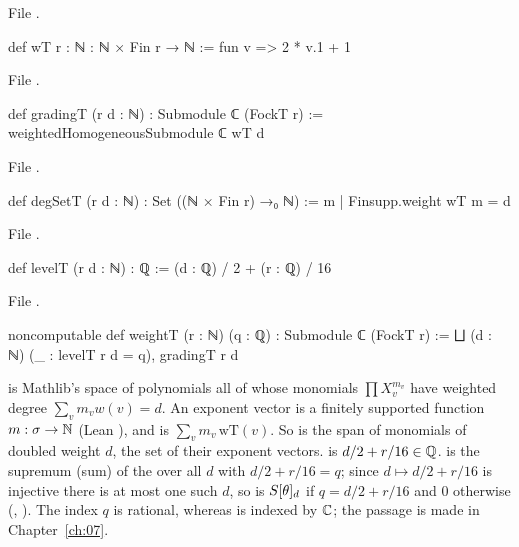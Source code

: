 \noindent File .
\begin{leancode}
def wT {r : ℕ} : ℕ × Fin r → ℕ := fun v => 2 * v.1 + 1
\end{leancode}
\noindent File .
\begin{leancode}
def gradingT (r d : ℕ) : Submodule ℂ (FockT r) := weightedHomogeneousSubmodule ℂ wT d
\end{leancode}
\noindent File .
\begin{leancode}
def degSetT (r d : ℕ) : Set ((ℕ × Fin r) →₀ ℕ) := {m | Finsupp.weight wT m = d}
\end{leancode}
\noindent File .
\begin{leancode}
def levelT (r d : ℕ) : ℚ := (d : ℚ) / 2 + (r : ℚ) / 16
\end{leancode}
\noindent File .
\begin{leancode}
noncomputable def weightT (r : ℕ) (q : ℚ) : Submodule ℂ (FockT r) :=
  ⨆ (d : ℕ) (_ : levelT r d = q), gradingT r d
\end{leancode}
\begin{dictionary}
 is Mathlib's space of polynomials all of whose monomials
$\prod X_v^{m_v}$ have weighted degree $\sum_v m_v w(v)=d$.  An exponent vector is a finitely
supported function $m:\sigma\to{\mathbb{N}}$ (Lean ), and  is
$\sum_v m_v\,\mathrm{wT}(v)$.  So  is the span of monomials of doubled weight
$d$,  the set of their exponent vectors.   is $d/2+r/16\in{\mathbb{Q}}$.
 is the supremum (sum) of the  over all $d$ with
$d/2+r/16=q$; since $d\mapsto d/2+r/16$ is injective there is at most one such $d$, so
 is $S[\theta]_d$ if $q=d/2+r/16$ and $0$ otherwise (,
).  The index $q$ is rational, whereas  is indexed
by ${\mathbb{C}}$; the passage is made in Chapter~\ref{ch:07}.
\end{dictionary}

